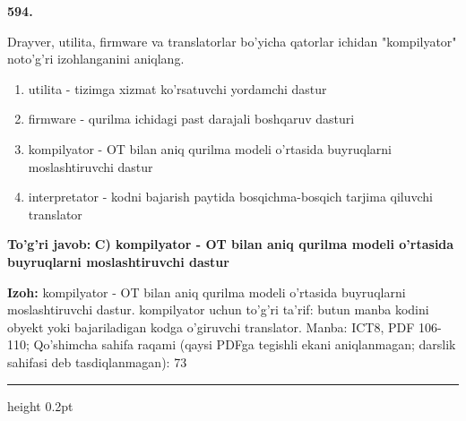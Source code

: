 \documentclass[10pt,a4paper]{article}
\begin{document}
{\bfseries\sffamily\color{ink} 594.}
\par
Drayver, utilita, firmware va translatorlar bo'yicha qatorlar ichidan "kompilyator" noto'g'ri izohlanganini aniqlang.
\begin{enumerate}[label=\Alph*),leftmargin=9mm]
\item utilita - tizimga xizmat ko'rsatuvchi yordamchi dastur
\item firmware - qurilma ichidagi past darajali boshqaruv dasturi
\item kompilyator - OT bilan aniq qurilma modeli o'rtasida buyruqlarni moslashtiruvchi dastur
\item interpretator - kodni bajarish paytida bosqichma-bosqich tarjima qiluvchi translator
\end{enumerate}
\begin{tcolorbox}[enhanced,breakable,colback=teal!4,colframe=teal!60!black,boxrule=0.45pt,arc=1.2mm,left=2.7mm,right=2.7mm,top=1.8mm,bottom=1.8mm,before skip=2mm,after skip=2mm]
{\bfseries\sffamily\color{teal}To'g'ri javob:} \textbf{C) kompilyator - OT bilan aniq qurilma modeli o'rtasida buyruqlarni moslashtiruvchi dastur}
\par\smallskip
{\bfseries Izoh:} kompilyator - OT bilan aniq qurilma modeli o'rtasida buyruqlarni moslashtiruvchi dastur. kompilyator uchun to'g'ri ta'rif: butun manba kodini obyekt yoki bajariladigan kodga o'giruvchi translator. Manba: ICT8, PDF 106-110; Qo'shimcha sahifa raqami (qaysi PDFga tegishli ekani aniqlanmagan; darslik sahifasi deb tasdiqlanmagan): 73
\end{tcolorbox}
\vspace{2mm}\hrule height 0.2pt\vspace{3mm}
\end{document}
